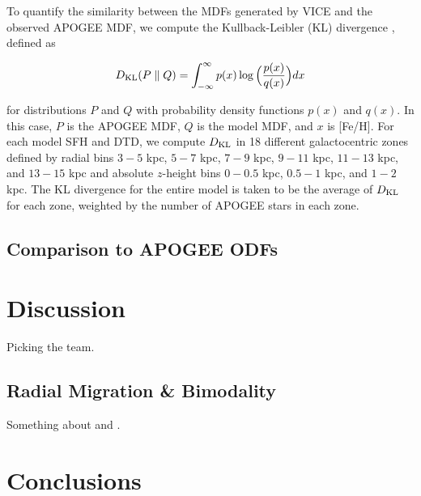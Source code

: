 \documentclass[twocolumn,linenumbers,twocolappendix]{aastex631}
\begin{document}
To quantify the similarity between the MDFs generated by VICE and the observed APOGEE MDF, we compute the Kullback-Leibler (KL) divergence \citep{KullbackLeibler1951}, defined as

\begin{equation}
\label{eq:kl-divergence}
D_{\rm{KL}}(P \parallel Q) = \int_{-\infty}^{\infty} p(x) \log\Big(\frac{p(x)}{q(x)}\Big) dx
\end{equation}

\noindent for distributions $P$ and $Q$ with probability density functions $p(x)$ and $q(x)$. In this case, $P$ is the APOGEE MDF, $Q$ is the model MDF, and $x$ is [Fe/H]. For each model SFH and DTD, we compute $D_{\rm{KL}}$ in 18 different galactocentric zones defined by radial bins $3-5$ kpc, $5-7$ kpc, $7-9$ kpc, $9-11$ kpc, $11-13$ kpc, and $13-15$ kpc and absolute $z$-height bins $0-0.5$ kpc, $0.5-1$ kpc, and $1-2$ kpc. The KL divergence for the entire model is taken to be the average of $D_{\rm{KL}}$ for each zone, weighted by the number of APOGEE stars in each zone.

\subsection{Comparison to APOGEE ODFs}


\section{Discussion}
\label{sec:discussion}

Picking the team.



\subsection{Radial Migration \& Bimodality}

Something about \citet{Johnson2021-Migration} and \citet{Schonrich2009-RadialMixing}.

\section{Conclusions}
\label{sec:conclusions}
\end{document}
